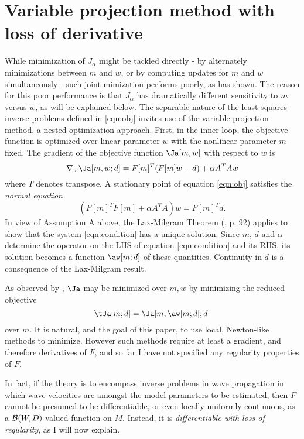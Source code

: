 \section{Variable projection method with loss of derivative}

While minimization of $J_{\alpha}$ might be tackled directly - by
alternately minimizations between $m$ and $w$, or by computing updates
for $m$ and $w$ simultaneously - such joint mimization performs
poorly, as \cite{YinHuang:16} has shown. The reason for this poor
performance is that $J_{\alpha}$ has dramatically different
sensitivity to $m$ versus $w$,
as will be explained below.
The separable nature of the least-squares inverse problems defined in \ref{eqn:obj} invites use of the variable projection method, a nested optimization approach. First, in the inner loop, the objective function is optimized over linear parameter $w$ with the nonlinear parameter $m$ fixed. 
The gradient of the objective function $\Ja[m, w]$ with respect to $w$ is
\begin{equation}
\nabla _{w} \Ja[m, w;d] =F[m]^T (F[m] w - d) 
+ \alpha A^T A  w 
\label{eqn:grad1}
\end{equation}
where $T$ denotes transpose.  A stationary point of equation \ref{eqn:obj} satisfies the {\em normal equation}
\begin{equation}
(F[m]^T F[m] + \alpha A^T A ) w = F[m]^T d.
\label{eqn:condition}
\end{equation}
In view of Assumption A above, the Lax-Milgram Theorem (\cite{Yosida}, p. 92)
applies to show that the system \ref{eqn:condition} has a
unique solution. Since $m$, $d$ and $\alpha$ determine the operator on the LHS
of equation \ref{eqn:condition} and its RHS, its solution becomes a
function $\aw[m;d]$ of these quantities. Continuity in $d$ is a
consequence of the Lax-Milgram result. 

As observed by \cite{GolubPereyra:73,GolubPereyra:03}, $\Ja$ may be minimized over $m,w$ by minimizing the reduced objective
\begin{equation}
  \label{eqn:red}
  \tJa[m; d] = \Ja[m,\aw[m;d];d]
\end{equation}
over $m$. It is natural, and the goal of this paper, to use local,
Newton-like methods to minimize. However such
methods require at least a gradient, and therefore derivatives of $F$,
and so far I have not specified any regularity properties of $F$.

In fact, if the theory is to encompass inverse problems in wave
propagation in which wave velocities are amongst the model parameters
to be estimated, then $F$ cannot be presumed to be differentiable, or
even locally uniformly continuous, as a ${\cal B}(W,D)$-valued
function on $M$. Instead, it is {\em differentiable with loss of
  regularity}, as I will now explain.

